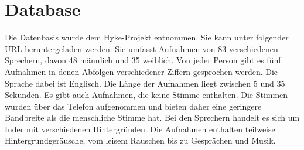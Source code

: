 \section{Database}

Die Datenbasis wurde dem Hyke-Projekt entnommen. Sie kann unter folgender URL heruntergeladen werden:
Sie umfasst Aufnahmen von 83 verschiedenen Sprechern, davon 48 männlich und 35 weiblich. Von jeder Person gibt es fünf Aufnahmen in denen Abfolgen verschiedener Ziffern gesprochen werden. Die Sprache dabei ist Englisch. Die Länge der Aufnahmen liegt zwischen 5 und 35 Sekunden. Es gibt auch Aufnahmen, die keine Stimme enthalten. Die Stimmen wurden über das Telefon aufgenommen und bieten daher eine geringere Bandbreite als die menschliche Stimme hat. Bei den Sprechern handelt es sich um Inder mit verschiedenen Hintergründen. Die Aufnahmen enthalten teilweise Hintergrundgeräusche, vom leisem Rauschen bis zu Gesprächen und Musik. 
